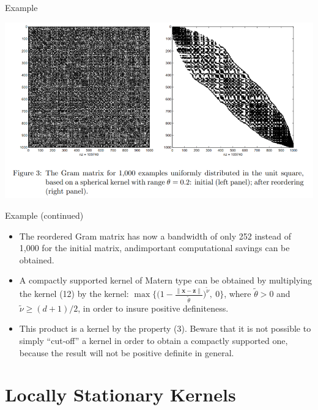 \documentclass[
  ignorenonframetext,
]{beamer}
\begin{document}
\begin{frame}{Example}
\protect\hypertarget{example}{}
\begin{center}\includegraphics[width=0.8\linewidth]{figure/marc_f3} \end{center}
\end{frame}

\begin{frame}{Example (continued)}
\protect\hypertarget{example-continued}{}
\begin{itemize}
\item
  The reordered Gram matrix has now a bandwidth of only 252 instead of
  1,000 for the initial matrix, andimportant computational savings can
  be obtained.
\item
  A compactly supported kernel of Matern type can be obtained by
  multiplying the kernel (12) by the kernel:
  \(\max \Big\{ \big(1 - \frac {\|\pmb x - \pmb z\|} {\tilde \theta} \big)^{\tilde \nu},\ 0\Big\}\),
  where \(\tilde \theta > 0\) and \(\tilde \nu \geq (d + 1)/2\), in
  order to insure positive definiteness.
\item
  This product is a kernel by the property (3). Beware that it is not
  possible to simply ``cut-off'' a kernel in order to obtain a compactly
  supported one, because the result will not be positive definite in
  general.
\end{itemize}
\end{frame}

\hypertarget{locally-stationary-kernels}{%
\section{Locally Stationary Kernels}\label{locally-stationary-kernels}}
\end{document}

